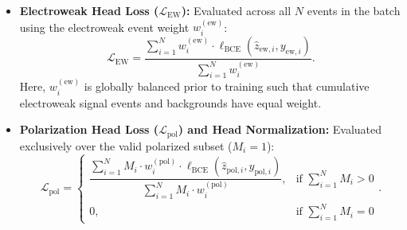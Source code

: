 \documentclass[12pt]{article}
\begin{document}
			\begin{itemize}
				\item \textbf{Electroweak Head Loss ($\mathcal{L}_{\mathrm{EW}}$):} Evaluated across all $N$ events in the batch using the electroweak event weight $w_i^{(\mathrm{ew})}$:
				\begin{equation*}
					\mathcal{L}_{\mathrm{EW}} = \frac{\sum_{i=1}^N w_i^{(\mathrm{ew})} \cdot \ell_{\mathrm{BCE}}(\hat{z}_{\mathrm{ew}, i}, y_{\mathrm{ew}, i})}{\sum_{i=1}^N w_i^{(\mathrm{ew})}}.
				\end{equation*}
				Here, $w_i^{(\mathrm{ew})}$ is globally balanced prior to training such that cumulative electroweak signal events and backgrounds have equal weight.

				\item \textbf{Polarization Head Loss ($\mathcal{L}_{\mathrm{pol}}$) and Head Normalization:} Evaluated exclusively over the valid polarized subset ($M_i = 1$):
				\begin{equation*}
					\mathcal{L}_{\mathrm{pol}} = \begin{cases}
						\dfrac{\sum_{i=1}^N M_i \cdot w_i^{(\mathrm{pol})} \cdot \ell_{\mathrm{BCE}}(\hat{z}_{\mathrm{pol}, i}, y_{\mathrm{pol}, i})}{\sum_{i=1}^N M_i \cdot w_i^{(\mathrm{pol})}}, & \text{if } \sum_{i=1}^N M_i > 0 \\
						0, & \text{if } \sum_{i=1}^N M_i = 0
					\end{cases}.
				\end{equation*}
			\end{itemize}
\end{document}
